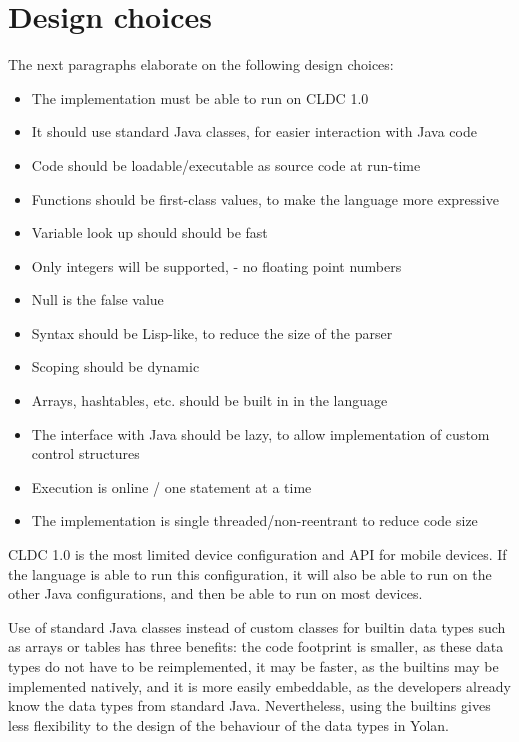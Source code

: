 \documentclass[11pt]{report}
\begin{document}
\section{Design choices}
The next paragraphs elaborate on the following design choices:
\begin{itemize}
\item The implementation must be able to run on CLDC 1.0
\item It should use standard Java classes, for easier interaction with Java code
\item Code should be loadable/executable as source code at run-time
\item Functions should be first-class values, to make the language more expressive
\item Variable look up should should be fast
\item Only integers will be supported, - no floating point numbers
\item Null is the false value
\item Syntax should be Lisp-like, to reduce the size of the parser
\item Scoping should be dynamic
\item Arrays, hashtables, etc. should be built in in the language
\item The interface with Java should be lazy, to allow implementation of custom control structures
\item Execution is online / one statement at a time
\item The implementation is single threaded/non-reentrant to reduce code size
\end{itemize}

CLDC 1.0 is the most limited device configuration and API for mobile devices. If the language is able to run this configuration, it will also be able to run on the other Java configurations, and then be able to run on most devices.

\label{yolandesign}
Use of standard Java classes instead of custom classes for builtin data types such as arrays or tables has three benefits: the code footprint is smaller, as these data types do not have to be reimplemented, it may be faster, as the builtins may be implemented natively, and it is more easily embeddable, as the developers already know the data types from standard Java. %
Nevertheless, using the builtins gives less flexibility to the design of the behaviour of the data types in Yolan.
\end{document}
